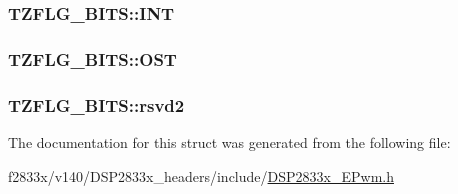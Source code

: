\subsubsection[{I\+N\+T}]{ T\+Z\+F\+L\+G\+\_\+\+B\+I\+T\+S\+::\+I\+N\+T}\label{struct_t_z_f_l_g___b_i_t_s_a30a47948c9f09737b1738836c0675cb8}
\hypertarget{struct_t_z_f_l_g___b_i_t_s_a1470de850b06afeaad899784e95a75c9}{}
\subsubsection[{O\+S\+T}]{ T\+Z\+F\+L\+G\+\_\+\+B\+I\+T\+S\+::\+O\+S\+T}\label{struct_t_z_f_l_g___b_i_t_s_a1470de850b06afeaad899784e95a75c9}
\hypertarget{struct_t_z_f_l_g___b_i_t_s_ab551b38c80c2eb56f237ecc27053b090}{}
\subsubsection[{rsvd2}]{ T\+Z\+F\+L\+G\+\_\+\+B\+I\+T\+S\+::rsvd2}\label{struct_t_z_f_l_g___b_i_t_s_ab551b38c80c2eb56f237ecc27053b090}


The documentation for this struct was generated from the following file\+:\begin{DoxyCompactItemize}
\item 
f2833x/v140/\+D\+S\+P2833x\+\_\+headers/include/\hyperlink{_d_s_p2833x___e_pwm_8h}{D\+S\+P2833x\+\_\+\+E\+Pwm.\+h}\end{DoxyCompactItemize}
